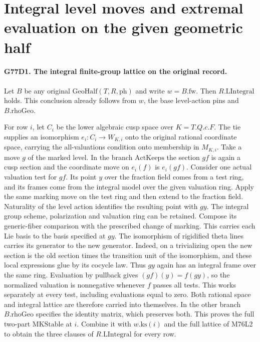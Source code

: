 \section{Integral level moves and extremal evaluation on the given geometric half}

\paragraph{G77D1. The integral finite-group lattice on the original record.}
Let $B$ be any original $\mathrm{GeoHalf}(T,R,\mathrm{ph})$ and
write $w=B.\mathrm{fw}$. Then $R.\mathrm{LIntegral}$ holds.
This conclusion already follows from $w$, the base level-action
pins and $B.\mathrm{rhoGeo}$.

For row $i$, let $C_i$ be the lower algebraic cusp space over
$K=T.Q.c.F$. The tie supplies an isomorphism $e_i:C_i\to W_{K,i}$
onto the original rational coordinate space, carrying the
all-valuations condition onto membership in $M_{K,i}$.
Take a move $g$ of the marked level. In the branch
$\mathrm{ActKeeps}$ the section $g f$ is again a cusp section and
the coordinate move on $e_i(f)$ is $e_i(g f)$. Consider one actual
valuation test for $g f$. Its point $y$ over the fraction field
comes from a test ring, and its frames come from the integral
model over the given valuation ring. Apply the same marking move
on the test ring and then extend to the fraction field. Naturality
of the level action identifies the resulting point with $g y$.
The integral group scheme, polarization and valuation ring can be
retained. Compose its generic-fiber comparison with the prescribed
change of marking. This carries each Lie basis to the basis specified
at $g y$. The isomorphism of rigidified theta lines carries its
generator to the new generator. Indeed, on a trivializing open the
new section is the old section times the transition unit of the
isomorphism, and these local expressions glue by its cocycle law.
Thus $g y$ again has an integral frame over the same ring. Evaluation
by pullback gives $(g f)(y)= f(g y)$, so the normalized valuation
is nonnegative whenever $f$ passes all tests. This works separately
at every test, including evaluations equal to zero. Both rational
space and integral lattice are therefore carried into themselves.
In the other branch $B.\mathrm{rhoGeo}$ specifies the identity
matrix, which preserves both. This proves the full two-part
$\mathrm{MKStable}$ at $i$. Combine it with $w.\mathrm{ks}(i)$
and the full lattice of M76L2 to obtain the three clauses of
$R.\mathrm{LIntegral}$ for every row.

